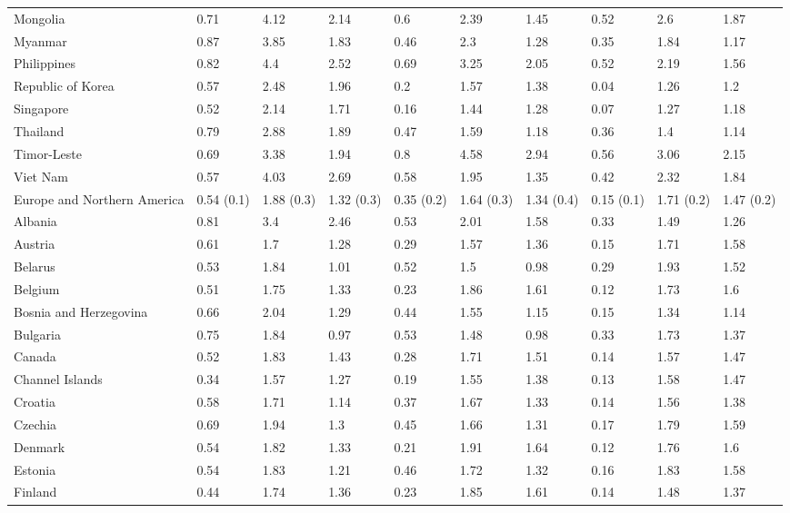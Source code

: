\begin{longtable}[t]{llllllllll}
\addlinespace
Mongolia & 0.71 & 4.12 & 2.14 & 0.6 & 2.39 & 1.45 & 0.52 & 2.6 & 1.87\\
Myanmar & 0.87 & 3.85 & 1.83 & 0.46 & 2.3 & 1.28 & 0.35 & 1.84 & 1.17\\
Philippines & 0.82 & 4.4 & 2.52 & 0.69 & 3.25 & 2.05 & 0.52 & 2.19 & 1.56\\
Republic of Korea & 0.57 & 2.48 & 1.96 & 0.2 & 1.57 & 1.38 & 0.04 & 1.26 & 1.2\\
Singapore & 0.52 & 2.14 & 1.71 & 0.16 & 1.44 & 1.28 & 0.07 & 1.27 & 1.18\\
\addlinespace
Thailand & 0.79 & 2.88 & 1.89 & 0.47 & 1.59 & 1.18 & 0.36 & 1.4 & 1.14\\
Timor-Leste & 0.69 & 3.38 & 1.94 & 0.8 & 4.58 & 2.94 & 0.56 & 3.06 & 2.15\\
Viet Nam & 0.57 & 4.03 & 2.69 & 0.58 & 1.95 & 1.35 & 0.42 & 2.32 & 1.84\\
Europe and Northern America & 0.54 (0.1) & 1.88 (0.3) & 1.32 (0.3) & 0.35 (0.2) & 1.64 (0.3) & 1.34 (0.4) & 0.15 (0.1) & 1.71 (0.2) & 1.47 (0.2)\\
Albania & 0.81 & 3.4 & 2.46 & 0.53 & 2.01 & 1.58 & 0.33 & 1.49 & 1.26\\
\addlinespace
Austria & 0.61 & 1.7 & 1.28 & 0.29 & 1.57 & 1.36 & 0.15 & 1.71 & 1.58\\
Belarus & 0.53 & 1.84 & 1.01 & 0.52 & 1.5 & 0.98 & 0.29 & 1.93 & 1.52\\
Belgium & 0.51 & 1.75 & 1.33 & 0.23 & 1.86 & 1.61 & 0.12 & 1.73 & 1.6\\
Bosnia and Herzegovina & 0.66 & 2.04 & 1.29 & 0.44 & 1.55 & 1.15 & 0.15 & 1.34 & 1.14\\
Bulgaria & 0.75 & 1.84 & 0.97 & 0.53 & 1.48 & 0.98 & 0.33 & 1.73 & 1.37\\
\addlinespace
Canada & 0.52 & 1.83 & 1.43 & 0.28 & 1.71 & 1.51 & 0.14 & 1.57 & 1.47\\
Channel Islands & 0.34 & 1.57 & 1.27 & 0.19 & 1.55 & 1.38 & 0.13 & 1.58 & 1.47\\
Croatia & 0.58 & 1.71 & 1.14 & 0.37 & 1.67 & 1.33 & 0.14 & 1.56 & 1.38\\
Czechia & 0.69 & 1.94 & 1.3 & 0.45 & 1.66 & 1.31 & 0.17 & 1.79 & 1.59\\
Denmark & 0.54 & 1.82 & 1.33 & 0.21 & 1.91 & 1.64 & 0.12 & 1.76 & 1.6\\
\addlinespace
Estonia & 0.54 & 1.83 & 1.21 & 0.46 & 1.72 & 1.32 & 0.16 & 1.83 & 1.58\\
Finland & 0.44 & 1.74 & 1.36 & 0.23 & 1.85 & 1.61 & 0.14 & 1.48 & 1.37\\

\end{longtable}

